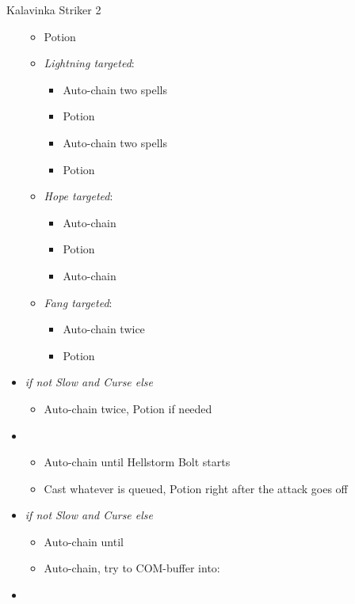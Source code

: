 \begin{paracol}{2}
\begin{battle}{Kalavinka Striker 2}
\begin{itemize}
\begin{itemize}
				      \item Potion
				      \item \textit{Lightning targeted}:
				            \begin{itemize}
					            \item Auto-chain two spells
					            \item Potion
					            \item Auto-chain two spells
					            \item Potion
				            \end{itemize}
				      \item \textit{Hope targeted}:
				            \begin{itemize}
					            \item Auto-chain
					            \item Potion
					            \item Auto-chain
				            \end{itemize}
				      \item \textit{Fang targeted}:
				            \begin{itemize}
					            \item Auto-chain twice
					            \item Potion
				            \end{itemize}
			      \end{itemize}
			\item \second \textit{ if not Slow and Curse else} \fourth
			      \begin{itemize}
				      \item Auto-chain twice, Potion if needed
			      \end{itemize}
			\item \third
			      \begin{itemize}
				      \item Auto-chain until Hellstorm Bolt starts
				      \item Cast whatever is queued, Potion right after the attack goes off
			      \end{itemize}
			\item \second \textit{ if not Slow and Curse else} \fourth
			      \begin{itemize}
				      \item Auto-chain until \stagger
				      \item Auto-chain, try to COM-buffer into:
			      \end{itemize}
			\item \fifth

\end{itemize}
\end{battle}
\end{paracol}
